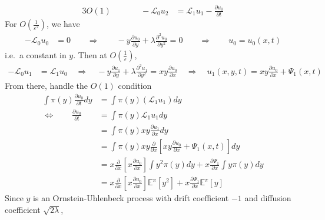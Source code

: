 \documentclass[12pt]{article}
\theoremstyle{plain}
\theoremstyle{definition}
\theoremstyle{remark}
\begin{document}
\begin{enumerate}
\begin{enumerate}
\begin{alignat*}{3}
          O(1) && \qquad -\mathscr{L}_0u_2 &=
          \mathscr{L}_1u_1
          - \frac{\partial u_0}{\partial t}
        \end{alignat*}
        For $O\left(\frac{1}{\varepsilon^2}\right)$, we have
        \begin{align*}
          -\mathscr{L}_0u_0 &= 0
          \qquad\Rightarrow\qquad
          -y \frac{\partial u_0}{\partial y}
          + \lambda\frac{\partial^2 u_0}{\partial y^2}
          = 0
          \qquad\Rightarrow\qquad
          u_0=u_0(x,t)
        \end{align*}
        i.e.\ a constant in $y$. Then at
        $O\left(\frac{1}{\varepsilon}\right)$,
        \begin{align*}
          -\mathscr{L}_0u_1 &= \mathscr{L}_1u_0
          \quad\Rightarrow\quad
          -y \frac{\partial u_1}{\partial y}
          + \lambda\frac{\partial^2 u_1}{\partial y^2}
          = xy \frac{\partial u_0}{\partial x}
          \quad\Rightarrow\quad
          u_1(x,y,t) = {xy} \frac{\partial u_0}{\partial x}
          +\Psi_1(x,t)
        \end{align*}
        From there, handle the $O(1)$ condition
        \begin{align*}
          \int \pi(y) \frac{\partial u_0}{\partial t} dy
          &=
          \int \pi(y)
          \left(
          \mathscr{L}_1u_1
          \right) dy\\
          \Leftrightarrow\qquad
          \frac{\partial u_0}{\partial t}
          &=
          \int \pi(y) \mathscr{L}_1u_1 dy\\
          &=
          \int \pi(y) xy \frac{\partial u_1}{\partial x} dy\\
          &=
          \int \pi(y) xy \frac{\partial }{\partial x}
          \left[
          {xy} \frac{\partial u_0}{\partial x}
          +\Psi_1(x,t)
          \right]dy\\
          &=
           x\frac{\partial }{\partial x}
          \left[ x\frac{\partial u_0}{\partial x} \right]
           \int y^2\pi(y) dy
          + x\frac{\partial \Psi_1}{\partial x}
          \int  y\pi(y) dy\\
          &=
           x\frac{\partial }{\partial x}
          \left[ x\frac{\partial u_0}{\partial x} \right]
          \mathbb{E}^\pi[y^2]
          + x\frac{\partial \Psi_1}{\partial x}
          \mathbb{E}^\pi[y]
        \end{align*}
        Since $y$ is an Ornstein-Uhlenbeck process with drift
        coefficient $-1$ and diffusion coefficient $\sqrt{2\lambda}$,

\end{enumerate}
\end{enumerate}
\end{document}
